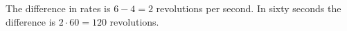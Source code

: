 The difference in rates is $6-4=2$ revolutions per second. In sixty seconds the difference is $2\cdot 60=\boxed{120}$ revolutions.
